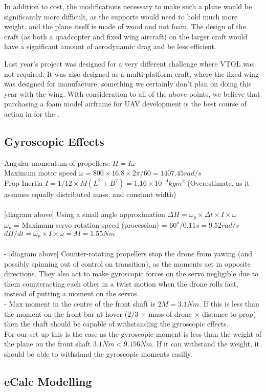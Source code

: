 In addition to cost, the modifications necessary to make such a plane would be significantly more difficult, as the supports would need to hold much more weight, and the plane itself is made of wood and not foam. \color{red} The design of the craft (as both a quadcopter and fixed wing aircraft) on the larger craft would have a significant amount of aerodynamic drag and be less efficient. \color{black}\\
	
Last year's project was designed for a very different challenge where VTOL was not required. It was also designed as a multi-platform craft, where the fixed wing was designed for manufacture, something we certainly don't plan on doing this year with the wing. With consideration to all of the above points, we believe that purchasing a foam model airframe for UAV development is the best course of action in for the \ID.

\subsection{Gyroscopic Effects}
Angular momentum of propellers: $H = I\omega$\\
Maximum motor speed $\omega = 800\times16.8\times2\pi/60 = 1407.45rad/s$\\
Prop Inertia $I = 1/12\times M(L^2+B^2) = 1.16\times10^{-4}kgm^2$ (Overestimate, as it assumes equally distributed mass, and constant width)\\\\

[diagram above] Using a small angle approximation $\Delta H = \omega_p \times\Delta t \times I \times \omega$\\ 
$\omega_p$ = Maximum servo rotation speed (procession) = $60^o/0.11s = 9.52rad/s$\\
$dH/dt = \omega_p \times I \times \omega = M = 1.55Nm$\\\\

- [diagram above] Counter-rotating propellers stop the drone from yawing (and possibly spinning out of control on transition), as the moments act in opposite directions. They also act to make gyroscopic forces on the servo negligible due to them counteracting each other in a twist motion when the drone rolls fast, instead of putting a moment on the servos.\\
- Max moment in the centre of the front shaft is $2M = 3.1Nm$. If this is less than the moment on the front bar at hover ($2/3$ $\times $ mass of drone $\times$ distance to prop) then the shaft should be capable of withstanding the gyroscopic effects.\\
For our set up this is the case as the gyroscopic moment is less than the weight of the plane on the front shaft $3.1Nm < 9.156Nm$. If it can withstand the weight, it should be able to withstand the gyroscopic moments easilly.

\subsection{eCalc Modelling}
\label{sec:ecalc}